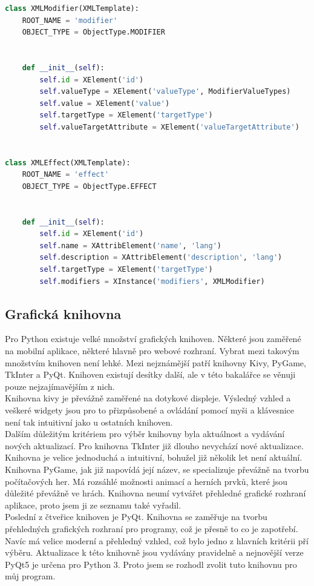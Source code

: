 \documentclass[thesis=B,czech]{resources/FITthesis}[2012/06/26]
\begin{document}
\begin{lstlisting}[float,language=Python, label=python_xml, caption=Mapování objektů na xml strukturu]
class XMLModifier(XMLTemplate):
    ROOT_NAME = 'modifier'
    OBJECT_TYPE = ObjectType.MODIFIER


    def __init__(self):
        self.id = XElement('id')
        self.valueType = XElement('valueType', ModifierValueTypes)
        self.value = XElement('value')
        self.targetType = XElement('targetType')
        self.valueTargetAttribute = XElement('valueTargetAttribute')


class XMLEffect(XMLTemplate):
    ROOT_NAME = 'effect'
    OBJECT_TYPE = ObjectType.EFFECT


    def __init__(self):
        self.id = XElement('id')
        self.name = XAttribElement('name', 'lang')
        self.description = XAttribElement('description', 'lang')
        self.targetType = XElement('targetType')
        self.modifiers = XInstance('modifiers', XMLModifier)

\end{lstlisting}

\subsection{Grafická knihovna}
Pro Python existuje velké množství grafických knihoven. Některé jsou zaměřené na mobilní aplikace, některé hlavně pro webové rozhraní. Vybrat mezi takovým množstvím knihoven není lehké. Mezi nejznámější patří knihovny Kivy, PyGame, TkInter a PyQt. Knihoven existují desítky další, ale v této bakalářce se věnuji pouze nejzajímavějším z nich.\\
Knihovna kivy je převážně zaměřené na dotykové displeje. Výsledný vzhled a veškeré widgety jsou pro to přizpůsobené a ovládání pomocí myši a klávesnice není tak intuitivní jako u ostatních knihoven.\\
Dalším důležitým kritériem pro výběr knihovny byla aktuálnost a vydávání nových aktualizací. Pro knihovna TkInter již dlouho nevychází nové aktualizace. Knihovna je velice jednoduchá a intuitivní, bohužel již několik let není aktuální. \\
Knihovna PyGame, jak již napovídá její název, se specializuje převážně na tvorbu počítačových her. Má rozsáhlé možnosti animací a herních prvků, které jsou důležité převážně ve hrách. Knihovna neumí vytvářet přehledné grafické rozhraní aplikace, proto jsem ji ze seznamu také vyřadil.\\
Poslední z čtveřice knihoven je PyQt. Knihovna se zaměřuje na tvorbu přehledných grafických rozhraní pro programy, což je přesně to co je zapotřebí. Navíc má velice moderní a přehledný vzhled, což bylo jedno z hlavních kritérii pří výběru. Aktualizace k této knihovně jsou vydávány pravidelně a nejnovější verze PyQt5 je určena pro Python 3. Proto jsem se rozhodl zvolit tuto knihovnu pro můj program.
\end{document}
